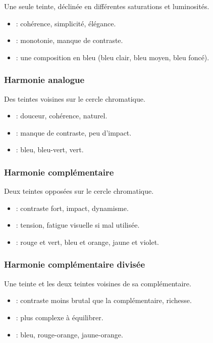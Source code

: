 Une seule teinte, déclinée en différentes saturations et luminosités.

\begin{itemize}
    \item {} : cohérence, simplicité, élégance.
    \item {} : monotonie, manque de contraste.
    \item {} : une composition en bleu (bleu clair, bleu moyen, bleu foncé).
\end{itemize}

\subsubsection{Harmonie analogue}

Des teintes voisines sur le cercle chromatique.

\begin{itemize}
    \item {} : douceur, cohérence, naturel.
    \item {} : manque de contraste, peu d'impact.
    \item {} : bleu, bleu-vert, vert.
\end{itemize}

\subsubsection{Harmonie complémentaire}

Deux teintes opposées sur le cercle chromatique.

\begin{itemize}
    \item {} : contraste fort, impact, dynamisme.
    \item {} : tension, fatigue visuelle si mal utilisée.
    \item {} : rouge et vert, bleu et orange, jaune et violet.
\end{itemize}

\subsubsection{Harmonie complémentaire divisée}

Une teinte et les deux teintes voisines de sa complémentaire.

\begin{itemize}
    \item {} : contraste moins brutal que la complémentaire, richesse.
    \item {} : plus complexe à équilibrer.
    \item {} : bleu, rouge-orange, jaune-orange.
\end{itemize}

